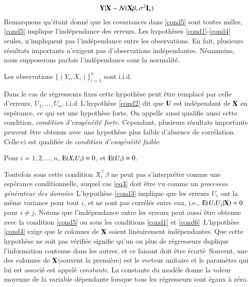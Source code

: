 \documentclass[10pt, reqno]{amsart}
\begin{document}
\begin{align*}
\mathbf Y|\mathbf X \sim\mathcal{N}(\mathbf X\beta, \sigma^2\mathbf{I}_n)
\end{align*}
Remarquons qu'étant donné que les covariances dans \eqref{cond5} sont toutes nulles, 
 \eqref{cond5} implique l'indépendance des erreurs. Les hypothèses \eqref{cond1}-\eqref{cond4} seules, 
 n'impliquent pas l'indépendance entre les observations. En fait, plusieurs résultats importants n'exigent pas 
 d'observations indépendantes. Néanmoins, nous supposerons parfois l'indépendance  sans la normalité.
\begin{condition}
Les observations $\{(Y_i, X_i)\}_{i=1}^n$ sont i.i.d.
\label{cond6}
\end{condition}
Dans le cas de régresseurs fixes cette hypothèse peut être remplacé par celle d'erreurs, $U_1, ..., U_n$, i.i.d\
L'hypothèse \eqref{cond2} dit que $\mathbf U$ est indépendant de $\mathbf X$ en espérance, ce qui est une hypothèse forte. On appelle aussi
qualifie aussi cette condition, \emph{condition d'exogénéité forte}. Cependant, plusieurs résultats importants peuvent être obtenus avec
 une hypothèse plus faible  d'absence de corrélation. Celle-ci est qualifiée de \emph{condition d'exogénéité faible}:
\begin{condition}
Pour $i=1,2,...,n$, $\operatorname{E}(X_iU_i)=0$, et $\operatorname{E}(U_i)=0$.
\label{cond7}
\end{condition}
Toutefois sous cette condition $X_i^\top\beta$ ne peut pas s'interpréter comme une espérance conditionnelle, auquel cas \eqref{eq3} doit être vu comme un \emph{processus générateur des données}\
L'hypothèse \eqref{cond3} implique que les erreurs $U_i$ ont la même variance pour tout $i$, et ne sont pas corrélés entre eux, i.e., $\operatorname{E}(U_iU_j| \mathbf X) = 0$ pour $i\neq j$. Notons que l'indépendance entre les erreurs peut aussi être obtenue avec la condition \eqref{cond5} ou sous les  conditions \eqref{cond1} et \eqref{cond6}\
L'hypothèse \eqref{cond4} exige que le colonnes de $\mathbf X$ soient linéairement indépendantes. Que cette hypothèse ne soit pas vérifiée signifie qu'un ou plus de régresseurs duplique l'information contenue dans les autres, et ce faisant doit être écarté\
Souvent, une des colonnes de $\mathbf X$(souvent la première) est le vecteur unitaire et le paramètre qui lui est associé est appelé \emph{constante}. La constante du modèle donne la valeur moyenne de la variable dépendante lorsque tous les régresseurs sont égaux à zéro.
\end{document}
